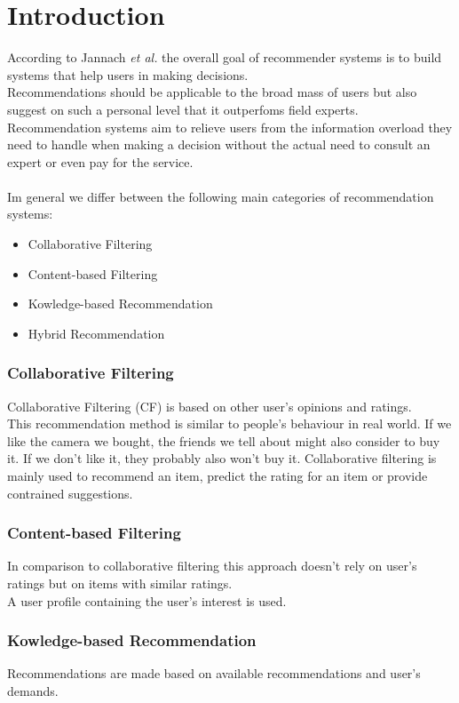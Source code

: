 \documentclass[runningheads,a4paper]{llncs}
\begin{document}
\section{Introduction}
According to Jannach \textit{et al.}\cite{jannach2010recommender}
 the overall goal of recommender systems is to build systems that help users in making decisions.\\
Recommendations should be applicable to the broad mass of users but also suggest on such a personal level that it outperfoms field experts. 
\\
Recommendation systems aim to relieve users from the information overload they need to handle when 
making a decision without the actual need to consult an expert or even pay for the service.\\ 
\\
Im general we differ between the following main categories of recommendation systems: 
\begin{itemize}
  \item Collaborative Filtering
  \item Content-based Filtering
  \item Kowledge-based Recommendation
  \item Hybrid Recommendation
\end{itemize}
\subsubsection{Collaborative Filtering}
Collaborative Filtering (CF) is based on other user's opinions and ratings. \\
This recommendation method is similar to people's behaviour in real world. If we like the camera we bought, 
the friends we tell about might also consider to buy it. If we don't like it, they probably also won't buy it.
Collaborative filtering is mainly used to recommend an item, 
predict the rating for an item or provide contrained suggestions. \cite{schafer2007collaborative}
\subsubsection{Content-based Filtering}
In comparison to collaborative filtering this approach doesn't rely on user's ratings but 
on items with similar ratings. \\A user profile containing the user's interest is used. \cite{burke2002hybrid}
\subsubsection{Kowledge-based Recommendation}
Recommendations are made based on available recommendations and user's demands. \cite{burke2002hybrid}
\end{document}
